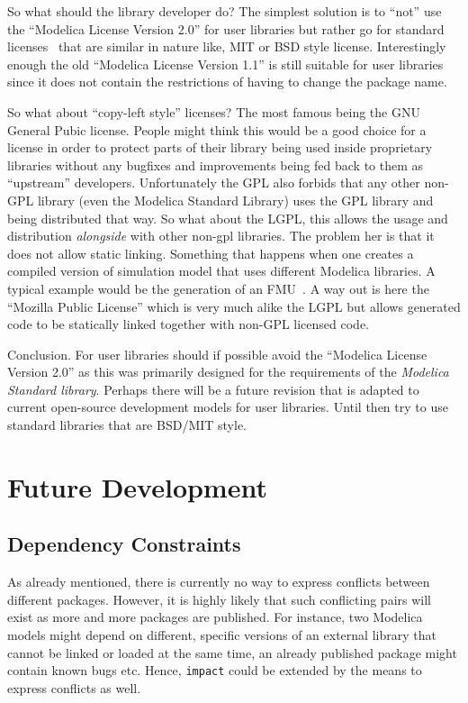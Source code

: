 \documentclass[11pt,a4paper,twocolumn]{article}
\newcommand{\code}[1]{\texttt{#1}} %
\begin{document}
So what should the library developer do? The simplest solution is to
``not'' use the ``Modelica License Version 2.0'' for user libraries
but rather go for standard licenses~\parencite{lic} that are similar
in  nature like, MIT or BSD style license. Interestingly enough the
old ``Modelica License Version 1.1'' is still suitable for user
libraries since it does not contain the restrictions of having to
change the package name.

So what about ``copy-left style'' licenses? The most famous being the
GNU General Pubic license. People might think this
would be a good choice for a license in order
to protect parts of their library being used inside proprietary
libraries without any bugfixes and improvements being fed back to them
as ``upstream'' developers. Unfortunately the GPL also forbids that any
other non-GPL library (even the Modelica Standard Library) uses
the GPL library and being distributed that way. So what about the
LGPL, this allows the usage and distribution \emph{alongside} with
other non-gpl libraries. The problem her is that it does not allow
static linking. Something that happens when one creates a compiled
version of simulation model that uses different Modelica libraries.
A typical example would be the generation of an FMU~\parencite{FMI}.
A way out is here the ``Mozilla Public License'' which is very much
alike the LGPL but allows generated code to be statically linked
together with non-GPL licensed code.

Conclusion. For user libraries should if possible avoid the ``Modelica
License Version 2.0'' as this was primarily designed for the
requirements of the \emph{Modelica Standard library}. Perhaps there
will be a future revision that is adapted to current open-source
development models for user libraries. Until then try to use standard
libraries that are BSD/MIT style.


\section{Future Development}

\subsection{Dependency Constraints}
As already mentioned, there is currently no way to express conflicts
between different packages.  However, it is highly likely that such
conflicting pairs will exist as more and more packages are published.
For instance, two Modelica models might depend on different, specific
versions of an external library that cannot be linked or loaded at the
same time, an already published package might contain known bugs etc.
Hence, \code{impact} could be extended by the means to express
conflicts as well.
\end{document}
